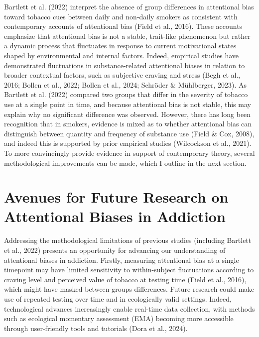 \documentclass[authordate, reflection, issue]{jote-new-article}
\begin{document}
	Bartlett et al. (2022) interpret the absence of group differences in attentional bias toward tobacco cues between daily and non-daily smokers as consistent with contemporary accounts of attentional bias (Field et al., 2016). These accounts emphasize that attentional bias is not a stable, trait-like phenomenon but rather a dynamic process that fluctuates in response to current motivational states shaped by environmental and internal factors. Indeed, empirical studies have demonstrated fluctuations in substance-related attentional biases in relation to broader contextual factors, such as subjective craving and stress (Begh et al., 2016; Bollen et al., 2022; Bollen et al., 2024; Schröder \& Mühlberger, 2023). As Bartlett et al. (2022) compared two groups that differ in the severity of tobacco use at a single point in time, and because attentional bias is not stable, this may explain why no significant difference was observed. However, there has long been recognition that in smokers, evidence is mixed as to whether attentional bias can distinguish between quantity and frequency of substance use (Field \& Cox, 2008), and indeed this is supported by prior empirical studies (Wilcockson et al., 2021). To more convincingly provide evidence in support of contemporary theory, several methodological improvements can be made, which I outline in the next section.



	\section{Avenues for Future Research on Attentional Biases in Addiction}



	Addressing the methodological limitations of previous studies (including Bartlett et al., 2022) presents an opportunity for advancing our understanding of attentional biases in addiction. Firstly, measuring attentional bias at a single timepoint may have limited sensitivity to within-subject fluctuations according to craving level and perceived value of tobacco at testing time (Field et al., 2016), which might have masked between-groups differences. Future research could make use of repeated testing over time and in ecologically valid settings. Indeed, technological advances increasingly enable real-time data collection, with methods such as ecological momentary assessment (EMA) becoming more accessible through user-friendly tools and tutorials (Dora et al., 2024).
\end{document}
